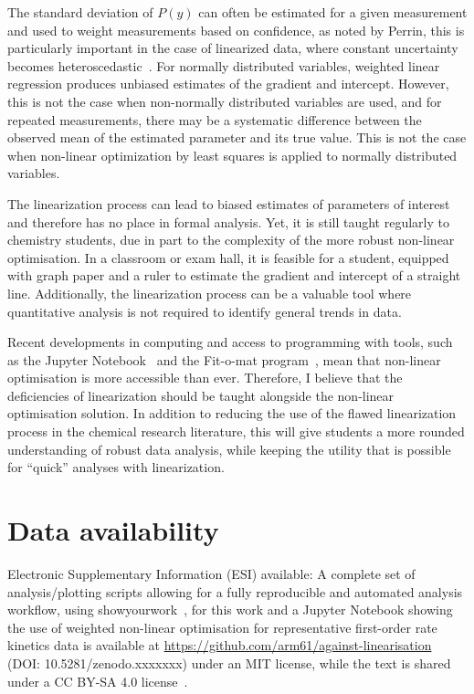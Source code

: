 \documentclass[journal=jceda8,manuscript=article]{achemso}
\begin{document}
The standard deviation of $P(y)$ can often be estimated for a given measurement and used to weight measurements based on confidence, as noted by Perrin, this is particularly important in the case of linearized data, where constant uncertainty becomes heteroscedastic~\cite{perrin_linear_2017}.
For normally distributed variables, weighted linear regression produces unbiased estimates of the gradient and intercept. 
However, this is not the case when non-normally distributed variables are used, and for repeated measurements, there may be a systematic difference between the observed mean of the estimated parameter and its true value.
This is not the case when non-linear optimization by least squares is applied to normally distributed variables. 

The linearization process can lead to biased estimates of parameters of interest and therefore has no place in formal analysis. 
Yet, it is still taught regularly to chemistry students, due in part to the complexity of the more robust non-linear optimisation. 
In a classroom or exam hall, it is feasible for a student, equipped with graph paper and a ruler to estimate the gradient and intercept of a straight line. 
Additionally, the linearization process can be a valuable tool where quantitative analysis is not required to identify general trends in data. 

Recent developments in computing and access to programming with tools, such as the Jupyter Notebook~\cite{kluyver_jupyter_2016} and the Fit-o-mat program~\cite{mglich_open_2018}, mean that non-linear optimisation is more accessible than ever. 
Therefore, I believe that the deficiencies of linearization should be taught alongside the non-linear optimisation solution. 
In addition to reducing the use of the flawed linearization process in the chemical research literature, this will give students a more rounded understanding of robust data analysis, while keeping the utility that is possible for ``quick'' analyses with linearization.

\section*{Data availability}

Electronic Supplementary Information (ESI) available: A complete set of analysis/plotting scripts allowing for a fully reproducible and automated analysis workflow, using showyourwork~\cite{luger_showyourwork_2021}, for this work and a Jupyter Notebook showing the use of weighted non-linear optimisation for representative first-order rate kinetics data is available at \url{https://github.com/arm61/against-linearisation} (DOI: 10.5281/zenodo.xxxxxxx) under an MIT license, while the text is shared under a CC BY-SA 4.0 license~\cite{mccluskey_github_2023}.
\end{document}
